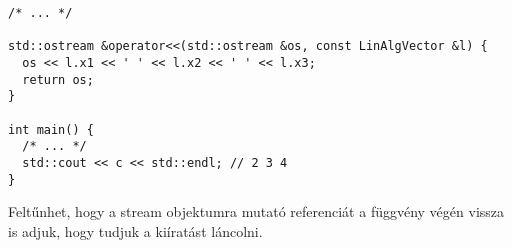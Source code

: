 \documentclass[../cpp_book/cpp_book.tex]{subfiles}
\begin{document}
	\begin{lstlisting}
/* ... */

std::ostream &operator<<(std::ostream &os, const LinAlgVector &l) {
  os << l.x1 << ' ' << l.x2 << ' ' << l.x3;
  return os;
}

int main() {
  /* ... */
  std::cout << c << std::endl; // 2 3 4
}
	\end{lstlisting}
	
	Feltűnhet, hogy a stream objektumra mutató referenciát a függvény végén vissza is adjuk, hogy tudjuk a kiíratást láncolni.
\end{document}
